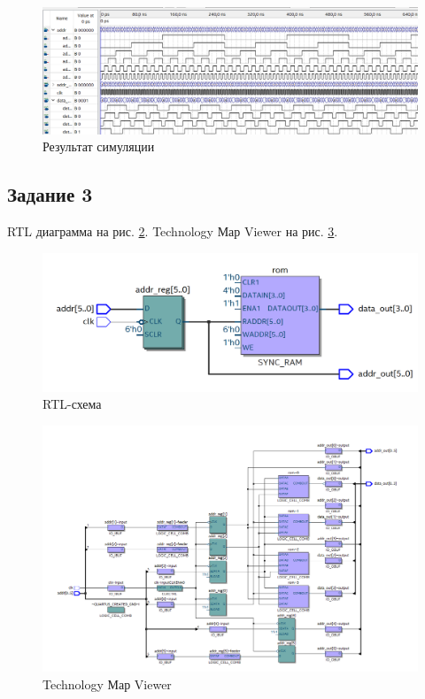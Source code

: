 \documentclass[a4paper,14pt]{article}
\begin{document}
	\begin{figure}[H]
		\centering
		\includegraphics[width=\linewidth]{images/z2_sim}
		\caption{Результат симуляции}
		\label{fig:z2_sim}
	\end{figure}

	\subsection{Задание 3}
	
	RTL диаграмма на рис. \ref{fig:z3_rtl}. Technology Мар Viewer на рис. \ref{fig:z3_tmv}.
	
	\begin{figure}[H]
		\centering
		\includegraphics[width=0.8\linewidth]{images/z3_rtl}
		\caption{RTL-схема}
		\label{fig:z3_rtl}
	\end{figure}
	
	\begin{figure}[H]
		\centering
		\includegraphics[width=\linewidth]{images/z3_tmv}
		\caption{Technology Мар Viewer}
		\label{fig:z3_tmv}
	\end{figure}
	
\end{document}
